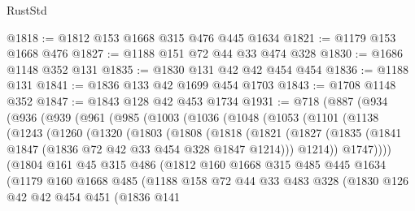 \begin{lexlean}{RustStd}
\begin{coremodule}
{\begin{coremodule}
{{{{{{{{{{@1818 := @1812 @153 @1668 @315 @476 @445 @1634
@1821 := @1179 @153 @1668 @476
@1827 := @1188 @151 @72 @44 @33 @474 @328
@1830 := @1686 @1148 @352 @131
@1835 := @1830 @131 @42 @42 @454 @454
@1836 := @1188 @131
@1841 := @1836 @133 @42 @1699 @454 @1703
@1843 := @1708 @1148 @352
@1847 := @1843 @128 @42 @453 @1734
@1931 := @718
    (@887
      (@934
        (@936
          (@939
            (@961
              (@985
                (@1003
                  (@1036
                    (@1048
                      (@1053
                        (@1101
                          (@1138
                            (@1243
                              (@1260
                                (@1320
                                  (@1803
                                    (@1808
                                      (@1818
                                        (@1821
                                          (@1827
                                            (@1835
                                              (@1841
                                                @1847
                                                (@1836 @72 @42 @33 @454 @328 @1847 @1214)))
                                            @1214))
                                        @1747))))
                                (@1804
                                  @161
                                  @45
                                  @315
                                  @486
                                  (@1812
                                    @160
                                    @1668
                                    @315
                                    @485
                                    @445
                                    @1634
                                    (@1179
                                      @160
                                      @1668
                                      @485
                                      (@1188
                                        @158
                                        @72
                                        @44
                                        @33
                                        @483
                                        @328
                                        (@1830
                                          @126
                                          @42
                                          @42
                                          @454
                                          @451
                                          (@1836
                                            @141
}}}}}}}}}}
\end{coremodule}}
\end{coremodule}
\end{lexlean}
